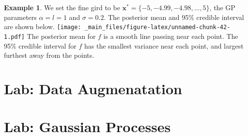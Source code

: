 \documentclass[
]{book}
\theoremstyle{definition}
\theoremstyle{definition}
\newtheorem{example}{Example}[chapter]
\theoremstyle{definition}
\theoremstyle{definition}
\theoremstyle{remark}
\begin{document}
\begin{example}
We set the fine gird to be \(\boldsymbol{x}^* = \{-5, -4.99, -4.98, \ldots, 5\}\), the GP parameters \(\alpha = l = 1\) and \(\sigma = 0.2\). The posterior mean and 95\% credible interval are shown below.
\texttt{[image: \_main\_files/figure-latex/unnamed-chunk-42-1.pdf]}
The posterior mean for \(f\) is a smooth line passing near each point. The 95\% credible interval for \(f\) has the smallest variance near each point, and largest furthest away from the points.
\end{example}

\hypertarget{lab-data-augmenatation}{%
\section{Lab: Data Augmenatation}\label{lab-data-augmenatation}}

\hypertarget{lab-gaussian-processes}{%
\section{Lab: Gaussian Processes}\label{lab-gaussian-processes}}

  
\end{document}
